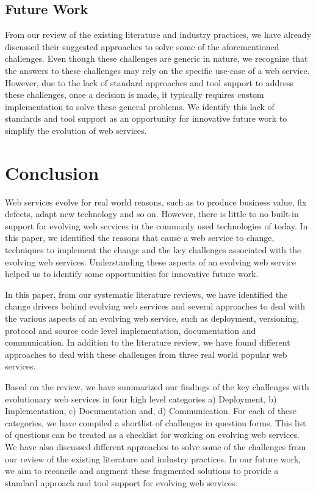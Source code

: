 \documentclass[runningheads,a4paper]{llncs}
\begin{document}

\subsection{Future Work} %
\label{sub:future_work}
From our review of the existing literature and industry practices, we have already discussed their suggested approaches to solve some of the aforementioned challenges. Even though these challenges are generic in nature, we recognize that the answers to these challenges may rely on the specific use-case of a web service. However, due to the lack of standard approaches and tool support to address these challenges, once a decision is made, it typically requires custom implementation to solve these general problems. We identify this lack of standards and tool support as an opportunity for innovative future work to simplify the evolution of web services.

\section{Conclusion} %
\label{sec:conclusion}
Web services evolve for real world reasons, such as to produce business value, fix defects, adapt new technology and so on. However, there is little to no built-in support for evolving web services in the commonly used technologies of today. In this paper, we identified the reasons that cause a web service to change, techniques to implement the change and the key challenges associated with the evolving web services. Understanding these aspects of an evolving web service helped us to identify some opportunities for innovative future work.

In this paper, from our systematic literature reviews, we have identified the change drivers behind evolving web services and several approaches to deal with the various aspects of an evolving web service, such as deployment, versioning, protocol and source code level implementation, documentation and communication. In addition to the literature review, we have found different approaches to deal with these challenges from three real world popular web services.

Based on the review, we have summarized our findings of the key challenges with evolutionary web services in four high level categories a) Deployment, b) Implementation, c) Documentation and, d) Communication. For each of these categories, we have compiled a shortlist of challenges in question forms. This list of questions can be treated as a checklist for working on evolving web services. We have also discussed different approaches to solve some of the challenges from our review of the existing literature and industry practices. In our future work, we aim to reconcile and augment these fragmented solutions to provide a standard approach and tool support for evolving web services.



\end{document}
